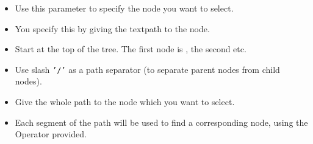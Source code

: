 \begin{itemize}
\item Use this parameter to specify the  node you want to select.
\item You specify this by giving the textpath to the node.
\item Start at the top of the tree. The first node is , the second  etc.
\item Use slash {\tt '/'} as a path separator (to separate parent nodes from child nodes).
\item Give the whole path to the node which you want to select.
\item Each segment of the path will be used to find a corresponding node, using the Operator provided.
  \end{itemize}
